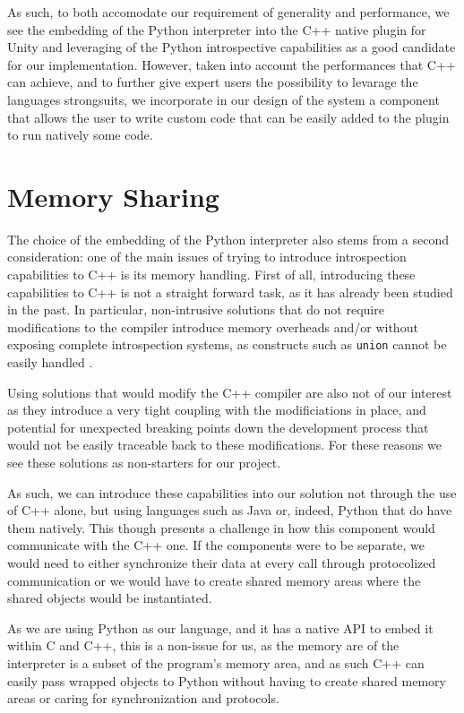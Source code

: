 As such, to both accomodate our requirement of generality and performance, we see the embedding of the Python interpreter into the C++ native plugin for Unity and leveraging of the Python introspective capabilities as a good candidate for our implementation. However, taken into account the performances that C++ can achieve, and to further give expert users the possibility to levarage the languages strongsuits, we incorporate in our design of the system a component that allows the user to write custom code that can be easily added to the plugin to run natively some code.

\section{Memory Sharing}

The choice of the embedding of the Python interpreter also stems from a second consideration: one of the main issues of trying to introduce introspection capabilities to C++ is its memory handling. First of all, introducing these capabilities to C++ is not a straight forward task, as it has already been studied in the past. In particular, non-intrusive solutions that do not require modifications to the compiler introduce memory overheads \cite{bayser2012rtti} and/or without exposing complete introspection systems, as constructs such as \verb|union| cannot be easily handled \cite{tyng1998nonintrusive}.

Using solutions that would modify the C++ compiler are also not of our interest as they introduce a very tight coupling with the modificiations in place, and potential for unexpected breaking points down the development process that would not be easily traceable back to these modifications. For these reasons we see these solutions as non-starters for our project.

As such, we can introduce these capabilities into our solution not through the use of C++ alone, but using languages such as Java or, indeed, Python that do have them natively. This though presents a challenge in how this component would communicate with the C++ one. If the components were to be separate, we would need to either synchronize their data at every call through protocolized communication or we would have to create shared memory areas where the shared objects would be instantiated.

As we are using Python as our language, and it has a native API to embed it within C and C++, this is a non-issue for us, as the memory are of the interpreter is a subset of the program's memory area, and as such C++ can easily pass wrapped objects to Python without having to create shared memory areas or caring for synchronization and protocols.

